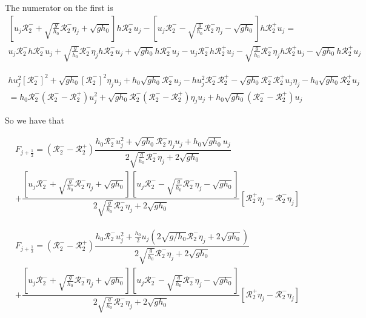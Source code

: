 \documentclass[12pt]{article}
\begin{document}
The numerator on the first is
\begin{multline}
\left[u_{j}\mathcal{R}_2^- + \sqrt{\frac{g}{h_0}} \mathcal{R}_2^- \eta_{j} + \sqrt{gh_0}\right]  h\mathcal{R}_2^- u_j - \left[u_{j}\mathcal{R}_2^- - \sqrt{\frac{g}{h_0}} \mathcal{R}_2^- \eta_{j} - \sqrt{gh_0}\right] h\mathcal{R}_2^+ u_j = \\
u_{j}\mathcal{R}_2^- h\mathcal{R}_2^- u_j + \sqrt{\frac{g}{h_0}} \mathcal{R}_2^- \eta_{j} h\mathcal{R}_2^- u_j + \sqrt{gh_0} h\mathcal{R}_2^- u_j - u_{j}\mathcal{R}_2^-h\mathcal{R}_2^+ u_j - \sqrt{\frac{g}{h_0}} \mathcal{R}_2^- \eta_{j}h\mathcal{R}_2^+ u_j - \sqrt{gh_0}h\mathcal{R}_2^+ u_j
\end{multline}


\begin{multline}
hu_{j}^2\left[\mathcal{R}_2^-\right]^2 + \sqrt{gh_0} \left[\mathcal{R}_2^-\right]^2 \eta_{j} u_j + h_0\sqrt{gh_0}\mathcal{R}_2^- u_j - hu_{j}^2\mathcal{R}_2^-\mathcal{R}_2^+ - \sqrt{gh_0} \mathcal{R}_2^- \mathcal{R}_2^+ u_j \eta_{j} - h_0\sqrt{gh_0}\mathcal{R}_2^+ u_j\\
= h_0 \mathcal{R}_2^- \left(\mathcal{R}_2^- - \mathcal{R}_2^+ \right)u_{j}^2 + \sqrt{gh_0} \mathcal{R}_2^-\left(\mathcal{R}_2^- - \mathcal{R}_2^+ \right) \eta_{j} u_j + h_0\sqrt{gh_0}\left( \mathcal{R}_2^-  - \mathcal{R}_2^+ \right)u_j
\end{multline}

So we have that

\begin{multline}
F_{j+\frac{1}{2}} = \left( \mathcal{R}_2^-  - \mathcal{R}_2^+ \right)\dfrac{h_0 \mathcal{R}_2^- u_{j}^2 + \sqrt{gh_0} \mathcal{R}_2^-\eta_{j} u_j + h_0\sqrt{gh_0}u_j}{2\sqrt{\frac{g}{h_0}} \mathcal{R}_2^-\eta_{j}  + 2\sqrt{gh_0}}  \\
+ \dfrac{\left[u_{j}\mathcal{R}_2^- + \sqrt{\frac{g}{h_0}} \mathcal{R}_2^- \eta_{j} + \sqrt{gh_0}\right] \left[u_{j}\mathcal{R}_2^- - \sqrt{\frac{g}{h_0}} \mathcal{R}_2^- \eta_{j} - \sqrt{gh_0}\right]}{2\sqrt{\frac{g}{h_0}} \mathcal{R}_2^-\eta_{j}  + 2\sqrt{gh_0} } \left [ \mathcal{R}_2^+\eta_j - \mathcal{R}_2^-\eta_j\right ]
\end{multline}

\begin{multline}
F_{j+\frac{1}{2}} = \left( \mathcal{R}_2^-  - \mathcal{R}_2^+ \right)\dfrac{h_0 \mathcal{R}_2^- u_{j}^2 + \frac{h_0}{2}u_j\left(2\sqrt{g/h_0} \mathcal{R}_2^-\eta_{j} + 2\sqrt{gh_0}\right)}{2\sqrt{\frac{g}{h_0}} \mathcal{R}_2^-\eta_{j}  + 2\sqrt{gh_0}}  \\
+ \dfrac{\left[u_{j}\mathcal{R}_2^- + \sqrt{\frac{g}{h_0}} \mathcal{R}_2^- \eta_{j} + \sqrt{gh_0}\right] \left[u_{j}\mathcal{R}_2^- - \sqrt{\frac{g}{h_0}} \mathcal{R}_2^- \eta_{j} - \sqrt{gh_0}\right]}{2\sqrt{\frac{g}{h_0}} \mathcal{R}_2^-\eta_{j}  + 2\sqrt{gh_0} } \left [ \mathcal{R}_2^+\eta_j - \mathcal{R}_2^-\eta_j\right ]
\end{multline}
\end{document}
